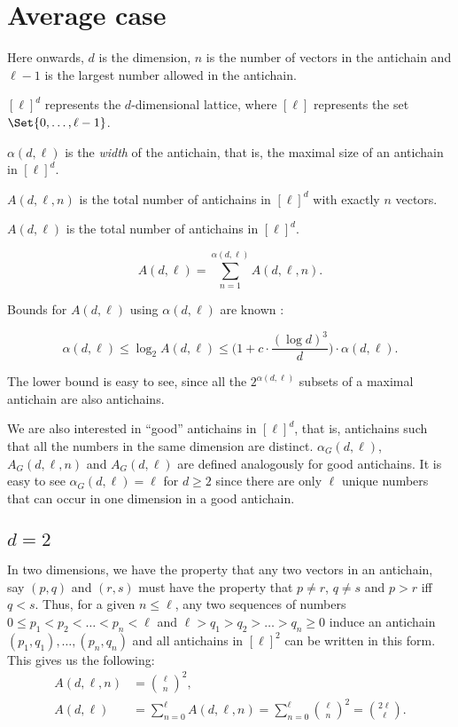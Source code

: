 
\section{Average case}

Here onwards, $d$ is the dimension, $n$ is the number of vectors in the antichain and $\ell-1$ is the largest number allowed in the antichain.

$[\ell]^d$ represents the $d$-dimensional lattice, where $[\ell]$ represents the set $\Set{0,\dots,\ell-1}$.

$\alpha(d,\ell)$ is the \emph{width} of the antichain, that is, the maximal size of an antichain in $[\ell]^d$.

$A(d,\ell,n)$ is the total number of antichains in $[\ell]^d$ with exactly $n$ vectors.

$A(d,\ell)$ is the total number of antichains in $[\ell]^d$. 

\[
A(d,\ell)=\sum_{n=1}^{\alpha(d,\ell)}A(d,\ell,n).
\]

Bounds for $A(d,\ell)$ using $\alpha(d,\ell)$ are known \cite{falgasravry2023dedekinds}:

\[
\alpha(d,\ell)\leq\log_2 A(d,\ell)\leq \Big(1+c\cdot\frac{(\log d)^3}{d}\Big)\cdot\alpha(d,\ell).
\]

The lower bound is easy to see, since all the $2^{\alpha(d,\ell)}$ subsets of a maximal antichain are also antichains. 

We are also interested in ``good'' antichains in $[\ell]^d$, that is, antichains such that all the numbers in the same dimension are distinct. $\alpha_G(d,\ell)$, $A_G(d,\ell,n)$ and $A_G(d,\ell)$ are defined analogously for good antichains. It is easy to see $\alpha_G(d,\ell)=\ell$ for $d\geq2$ since there are only $\ell$ unique numbers that can occur in one dimension in a good antichain.

\subsection{$d=2$}

In two dimensions, we have the property that any two vectors in an antichain, say $(p,q)$ and $(r,s)$ must have the property that $p\neq r$, $q\neq s$ and $p>r$ iff $q<s$. Thus, for a given $n\leq\ell$, any two sequences of numbers $0\leq p_1<p_2<\dots<p_n<\ell$ and $\ell>q_1>q_2>\dots>q_n\geq0$ induce an antichain $(p_1,q_1),\dots,(p_n,q_n)$ and all antichains in $[\ell]^2$ can be written in this form. This gives us the following:
\begin{align}
    A(d,\ell,n)&=\binom{\ell}{n}^2,\\
    A(d,\ell)&=\sum_{n=0}^{\ell}A(d,\ell,n)=\sum_{n=0}^{\ell}\binom{\ell}{n}^2=\binom{2\ell}{\ell}.
\end{align}

